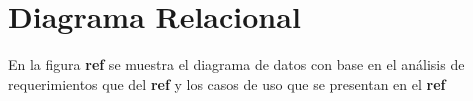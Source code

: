 \section{Diagrama Relacional}

En la figura \textbf{ref} se muestra el diagrama de datos con base en el análisis de requerimientos que
del \textbf{ref} y los  casos de uso que se presentan en el \textbf{ref}
%            
%    

%
%

